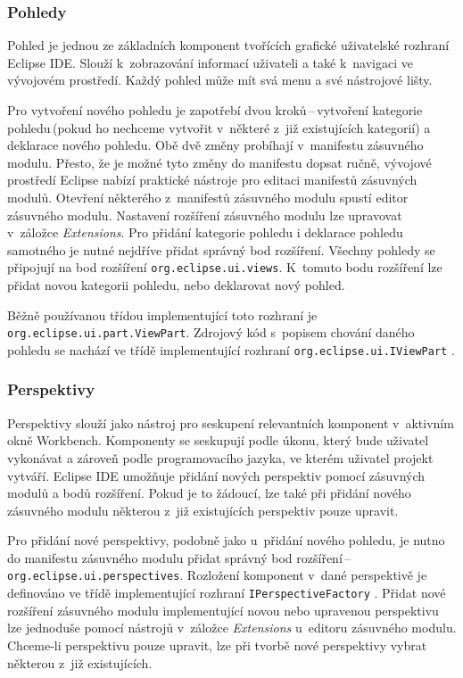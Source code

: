       \subsubsection{Pohledy}
      Pohled je jednou ze základních komponent tvořících grafické uživatelské rozhraní Eclipse IDE. Slouží k~zobrazování informací uživateli a také k~navigaci ve vývojovém prostředí. Každý pohled může mít svá menu a své nástrojové lišty.

      Pro vytvoření nového pohledu je zapotřebí dvou kroků\,--\,vytvoření kategorie pohledu\,(pokud ho nechceme vytvořit v~některé z~již existujících kategorií) a deklarace nového pohledu. Obě dvě změny probíhají v~manifestu zásuvného modulu. Přesto, že je možné tyto změny do manifestu dopsat ručně, vývojové prostředí Eclipse nabízí praktické nástroje pro editaci manifestů zásuvných modulů. Otevření některého z~manifestů zásuvného modulu spustí editor zásuvného modulu. Nastavení rozšíření zásuvného modulu lze upravovat v~záložce \emph{Extensions}. Pro přidání kategorie pohledu i deklarace pohledu samotného je nutné nejdříve přidat správný bod rozšíření. Všechny pohledy se připojují na bod rozšíření \texttt{org.eclipse.ui.views}. K~tomuto bodu rozšíření lze přidat novou kategorii pohledu, nebo deklarovat nový pohled.

      Běžně používanou třídou implementující toto rozhraní je \texttt{org.eclipse.ui.part.ViewPart}. Zdrojový kód s~popisem chování daného pohledu se nachází ve třídě implementující rozhraní \texttt{org.eclipse.ui.IViewPart} \cite{Plugins}.

      \subsubsection{Perspektivy}
      Perspektivy slouží jako nástroj pro seskupení relevantních komponent v~aktivním okně Workbench. Komponenty se seskupují podle úkonu, který bude uživatel vykonávat a  zároveň podle programovacího jazyka, ve kterém uživatel projekt vytváří. Eclipse IDE umožňuje přidání nových perspektiv pomocí zásuvných modulů a bodů rozšíření. Pokud je to žádoucí, lze také při přidání nového zásuvného modulu některou z~již existujících perspektiv pouze upravit.

      Pro přidání nové perspektivy, podobně jako u~přidání nového pohledu, je nutno do manifestu zásuvného modulu přidat správný bod rozšíření\,--\,\texttt{org.eclipse.ui.perspectives}. Rozložení komponent v~dané perspektivě je definováno ve třídě implementující rozhraní \texttt{IPerspectiveFactory} \cite{Plugins}. Přidat nové rozšíření zásuvného modulu implementující novou nebo upravenou perspektivu lze jednoduše pomocí nástrojů v~záložce \emph{Extensions} u~editoru zásuvného modulu. Chceme-li perspektivu pouze upravit, lze při tvorbě nové perspektivy vybrat některou z~již existujících.

